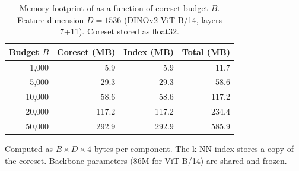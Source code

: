 \begin{table}[htbp]
\centering
\caption{Memory footprint of \method{} as a function of coreset budget $B$. Feature dimension $D=1536$ (DINOv2 ViT-B/14, layers 7+11). Coreset stored as float32.}
\label{tab:memory_footprint}
\begin{tabular}{rrrr}
\toprule
Budget $B$ & Coreset (MB) & Index (MB) & Total (MB) \\
\midrule
1{,}000   &  5.9  &  5.9  &  11.7 \\
5{,}000   & 29.3  & 29.3  &  58.6 \\
10{,}000  & 58.6  & 58.6  & 117.2 \\
20{,}000  & 117.2 & 117.2 & 234.4 \\
50{,}000  & 292.9 & 292.9 & 585.9 \\
\bottomrule
\end{tabular}
\vspace{1mm}
\footnotesize{Computed as $B \times D \times 4$ bytes per component. The k-NN index stores a copy of the coreset. Backbone parameters (86M for ViT-B/14) are shared and frozen.}
\end{table}
